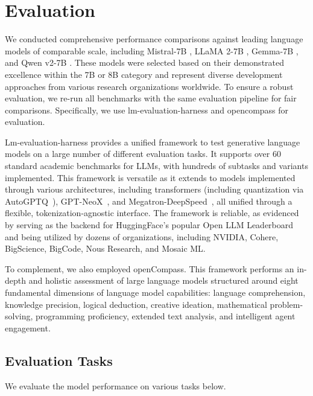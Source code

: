 \section{Evaluation}\label{sec4.evaluation}


We conducted comprehensive performance comparisons against leading language models of comparable scale, including Mistral-7B \cite{jiang2023mistral7b}, LLaMA 2-7B \cite{touvron2023llama}, Gemma-7B \cite{team2024gemma}, and Qwen v2-7B \cite{yang2024qwen2}. These models were selected based on their demonstrated excellence within the 7B or 8B category and represent diverse development approaches from various research organizations worldwide. To ensure a robust evaluation, we re-run all benchmarks with the same evaluation pipeline for fair comparisons. Specifically, we use lm-evaluation-harness \cite{lmevaluationharness} and opencompass \cite{open_compass} for evaluation.

Lm-evaluation-harness provides a unified framework to test generative language models on a large number of different evaluation tasks. It supports over 60 standard academic benchmarks for LLMs, with hundreds of subtasks and variants implemented.
This framework is versatile as it extends to models implemented through various architectures, including transformers (including quantization via AutoGPTQ~\cite{AutoGPTQ}), GPT-NeoX~\cite{black2022gpt}, and Megatron-DeepSpeed~\cite{song2023deepspeed4science}, all unified through a flexible, tokenization-agnostic interface.
The framework is reliable, as evidenced by serving as the backend for HuggingFace's popular Open LLM Leaderboard and being utilized by dozens of organizations, including NVIDIA, Cohere, BigScience, BigCode, Nous Research, and Mosaic ML. 

To complement, we also employed openCompass. This framework performs an in-depth and holistic assessment of large language models structured around eight fundamental dimensions of language model capabilities: language comprehension, knowledge precision, logical deduction, creative ideation, mathematical problem-solving, programming proficiency, extended text analysis, and intelligent agent engagement.



\subsection{Evaluation Tasks}\label{sec4.1}

We evaluate the model performance on various tasks below.


